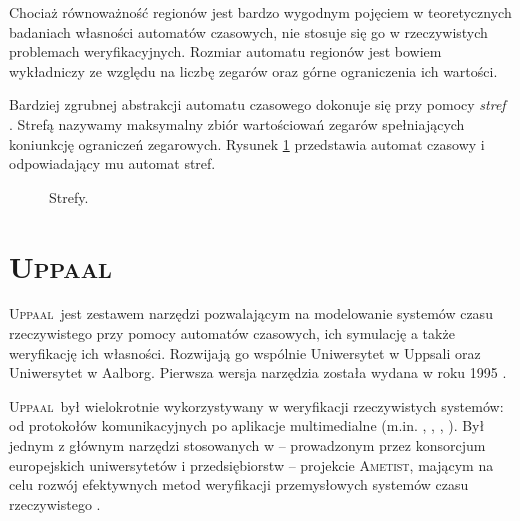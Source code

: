\documentclass{pracamgr}
\newcommand{\upp}{\textsc{Uppaal}}
\theoremstyle{plain}
\begin{document}
Chociaż równoważność regionów jest bardzo wygodnym pojęciem w
teoretycznych badaniach własności automatów czasowych, nie stosuje się
go w rzeczywistych problemach weryfikacyjnych. Rozmiar automatu
regionów jest bowiem wykładniczy ze względu na liczbę zegarów oraz
górne ograniczenia ich wartości.

Bardziej zgrubnej abstrakcji automatu czasowego dokonuje się przy
pomocy \emph{stref} \cite{henz-94}. Strefą nazywamy maksymalny zbiór
wartościowań zegarów spełniających koniunkcję ograniczeń zegarowych.
Rysunek \ref{img:zones} przedstawia automat czasowy i odpowiadający mu
automat stref.

\begin{figure}[ht]
  \centering
   \hspace{1cm}
  \caption{Strefy.}
  \label{img:zones}
\end{figure}

\section{\upp}
\label{uppaal}

\upp\ jest zestawem narzędzi pozwalającym na modelowanie systemów czasu
rzeczywistego przy pomocy automatów czasowych, ich symulację a także
weryfikację ich własności. Rozwijają go wspólnie Uniwersytet w Uppsali
oraz Uniwersytet w Aalborg. Pierwsza wersja narzędzia została wydana w roku
1995 \cite{lpw:fct95}.

\upp\ był wielokrotnie wykorzystywany w weryfikacji rzeczywistych
systemów: od protokołów komunikacyjnych po aplikacje multimedialne
(m.in. \cite{lp:prfts97}, \cite{lpw:tacas98},
\cite{DBLP:conf/icfem/BordbarO03},
\cite{Ravn:2011:MVW:1987389.1987431}). Był jednym z głównym narzędzi
stosowanych w -- prowadzonym przez konsorcjum europejskich
uniwersytetów i przedsiębiorstw -- projekcie \textsc{Ametist}, mającym
na celu rozwój efektywnych metod weryfikacji przemysłowych systemów czasu
rzeczywistego \cite{AMETISTfinal}.
\end{document}
